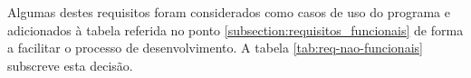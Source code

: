Algumas destes requisitos foram considerados como casos de uso do programa e adicionados à tabela referida no ponto \ref{subsection:requisitos_funcionais} de forma a facilitar o processo de desenvolvimento. A tabela \ref{tab:req-nao-funcionais} subscreve esta decisão.






